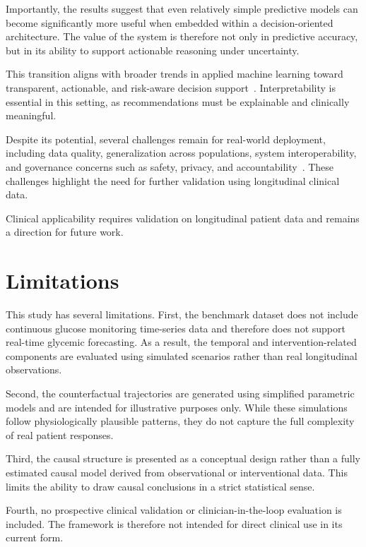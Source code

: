 \documentclass[journal]{IEEEtran}
\begin{document}
Importantly, the results suggest that even relatively simple predictive models can become significantly more useful when embedded within a decision-oriented architecture. The value of the system is therefore not only in predictive accuracy, but in its ability to support actionable reasoning under uncertainty.

This transition aligns with broader trends in applied machine learning toward transparent, actionable, and risk-aware decision support~\cite{ref15,ref16,ref17,ref35,ref36,ref37}. Interpretability is essential in this setting, as recommendations must be explainable and clinically meaningful.

Despite its potential, several challenges remain for real-world deployment, including data quality, generalization across populations, system interoperability, and governance concerns such as safety, privacy, and accountability~\cite{ref7,ref8,ref13,ref21,ref22,ref38}. These challenges highlight the need for further validation using longitudinal clinical data.

Clinical applicability requires validation on longitudinal patient data and remains a direction for future work.

\section{Limitations}
This study has several limitations. First, the benchmark dataset does not include continuous glucose monitoring time-series data and therefore does not support real-time glycemic forecasting. As a result, the temporal and intervention-related components are evaluated using simulated scenarios rather than real longitudinal observations.

Second, the counterfactual trajectories are generated using simplified parametric models and are intended for illustrative purposes only. While these simulations follow physiologically plausible patterns, they do not capture the full complexity of real patient responses.

Third, the causal structure is presented as a conceptual design rather than a fully estimated causal model derived from observational or interventional data. This limits the ability to draw causal conclusions in a strict statistical sense.

Fourth, no prospective clinical validation or clinician-in-the-loop evaluation is included. The framework is therefore not intended for direct clinical use in its current form.
\end{document}
